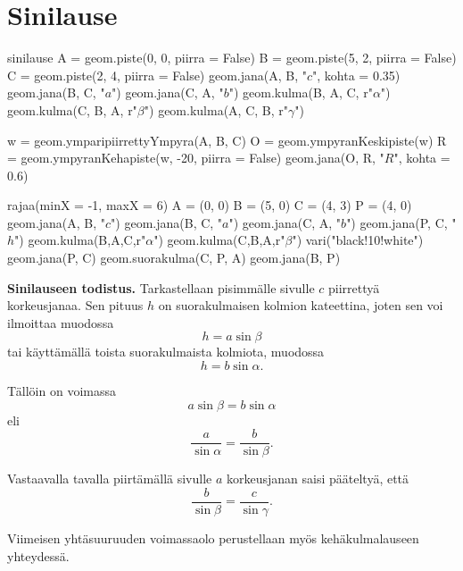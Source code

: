 \section{Sinilause}

\begin{luoKuva}{sinilause}
A = geom.piste(0, 0, piirra = False)
B = geom.piste(5, 2, piirra = False)
C = geom.piste(2, 4, piirra = False)
geom.jana(A, B, "$c$", kohta = 0.35)
geom.jana(B, C, "$a$")
geom.jana(C, A, "$b$")
geom.kulma(B, A, C, r"$\alpha$")
geom.kulma(C, B, A, r"$\beta$")
geom.kulma(A, C, B, r"$\gamma$")

w = geom.ymparipiirrettyYmpyra(A, B, C)
O = geom.ympyranKeskipiste(w)
R = geom.ympyranKehapiste(w, -20, piirra = False)
geom.jana(O, R, "$R$", kohta = 0.6)
\end{luoKuva}


\begin{center}
 \begin{kuva}
	rajaa(minX = -1, maxX = 6)
	A = (0, 0)
	B = (5, 0)
	C = (4, 3)
	P = (4, 0)
	geom.jana(A, B, "$c$")
	geom.jana(B, C, "$a$")
	geom.jana(C, A, "$b$")
	geom.jana(P, C, "$h$")
	geom.kulma(B,A,C,r"$\alpha$")
	geom.kulma(C,B,A,r"$\beta$")
	vari("black!10!white")
	geom.jana(P, C)
	geom.suorakulma(C, P, A)
	geom.jana(B, P)
\end{kuva}
\end{center}


\textbf{Sinilauseen todistus.} Tarkastellaan pisimmälle sivulle $c$ piirrettyä korkeusjanaa.
Sen pituus $h$ on suorakulmaisen kolmion kateettina, joten sen voi ilmoittaa muodossa
\[
h = a \sin \beta
\]
tai käyttämällä toista suorakulmaista kolmiota, muodossa
\[
h = b \sin \alpha .
\]

Tällöin on voimassa
\[
a \sin \beta = b \sin \alpha
\]
eli
\[
\frac{a}{\sin \alpha} = \frac{b}{\sin \beta}.
\]

Vastaavalla tavalla piirtämällä sivulle $a$ korkeusjanan saisi pääteltyä, että
\[
\frac{b}{\sin \beta} = \frac{c}{\sin \gamma}.
\]

Viimeisen yhtäsuuruuden voimassaolo perustellaan myös kehäkulmalauseen yhteydessä.
